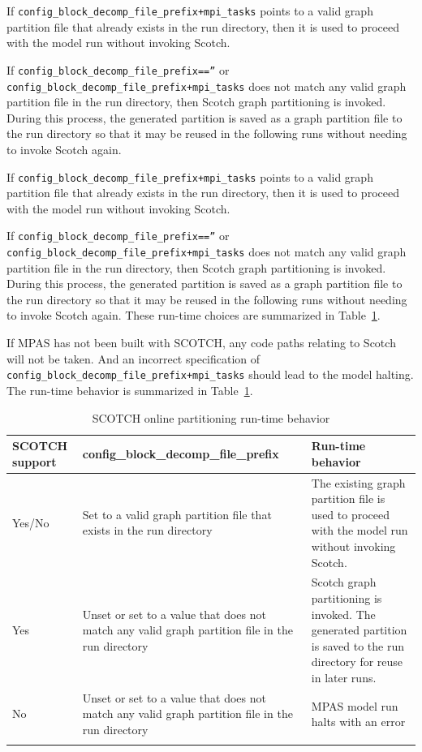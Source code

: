 If {\tt config\_block\_decomp\_file\_prefix+mpi\_tasks} points to a valid graph partition file that already exists in the run directory, then it is used to proceed with the model run without invoking Scotch.

If {\tt config\_block\_decomp\_file\_prefix==''} or {\tt config\_block\_decomp\_file\_prefix+mpi\_tasks} does not match any valid graph partition file in the run directory, then Scotch graph partitioning is invoked. During this process, the generated partition is saved as a graph partition file to the run directory so that it may be reused in the following runs without needing to invoke Scotch again.



If {\tt config\_block\_decomp\_file\_prefix+mpi\_tasks} points to a valid graph partition file that already exists in the run directory, then it is used to proceed with the model run without invoking Scotch.

If {\tt config\_block\_decomp\_file\_prefix==''} or {\tt config\_block\_decomp\_file\_prefix+mpi\_tasks} does not match any valid graph partition file in the run directory, then Scotch graph partitioning is invoked. During this process, the generated partition is saved as a graph partition file to the run directory so that it may be reused in the following runs without needing to invoke Scotch again. These run-time choices are summarized in Table~\ref{tab:scotch_runtime_behavior}.

If MPAS has not been built with SCOTCH, any code paths relating to Scotch will not be taken. And an incorrect specification of {\tt config\_block\_decomp\_file\_prefix+mpi\_tasks} should lead to the model halting. The run-time behavior is summarized in Table~\ref{tab:scotch_runtime_behavior}.

\vspace{12pt}
\begin{longtable}{|p{0.6in}|p{2.7in}|p{2.7in}|}
\hline
\textbf{SCOTCH support} & \textbf{config\_block\_decomp\_file\_prefix} & \textbf{Run-time behavior} \\ \hline
Yes/No & Set to a valid graph partition file that exists in the run directory &
The existing graph partition file is used to proceed with the model run without invoking Scotch. \\ \hline
Yes & Unset or set to a value that does not match any valid graph partition file in the run directory &
Scotch graph partitioning is invoked. The generated partition is saved to the run directory for reuse in later runs. \\ \hline
No & Unset or set to a value that does not match any valid graph partition file in the run directory &
MPAS model run halts with an error \\ \hline
\caption{SCOTCH online partitioning run-time behavior}\label{tab:scotch_runtime_behavior} \\
\end{longtable}
\vspace{12pt}





